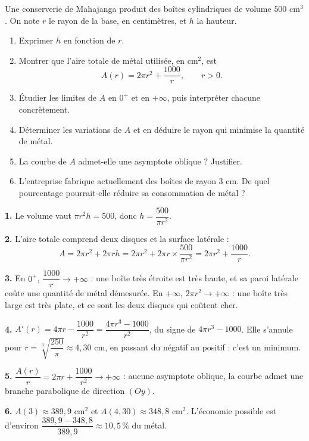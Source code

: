 \begin{jecherche}
Une conserverie de Mahajanga produit des boîtes cylindriques de volume
$500$ cm$^{3}$. On note $r$ le rayon de la base, en centimètres, et $h$ la
hauteur.

\begin{enumerate}[label=\textbf{\arabic*.}, leftmargin=*, itemsep=0.3em]
  \item Exprimer $h$ en fonction de $r$.
  \item Montrer que l'aire totale de métal utilisée, en cm$^{2}$, est
        \[
          A(r) = 2\pi r^{2} + \frac{1000}{r}, \qquad r > 0 .
        \]
  \item Étudier les limites de $A$ en $0^{+}$ et en $+\infty$, puis interpréter
        chacune concrètement.
  \item Déterminer les variations de $A$ et en déduire le rayon qui minimise
        la quantité de métal.
  \item La courbe de $A$ admet-elle une asymptote oblique ? Justifier.
  \item L'entreprise fabrique actuellement des boîtes de rayon $3$ cm. De
        quel pourcentage pourrait-elle réduire sa consommation de métal ?
\end{enumerate}
\end{jecherche}

\begin{corrige}
\textbf{1.} Le volume vaut $\pi r^{2}h = 500$, donc
$h = \dfrac{500}{\pi r^{2}}$.

\textbf{2.} L'aire totale comprend deux disques et la surface latérale :
\[
  A = 2\pi r^{2} + 2\pi r h = 2\pi r^{2} + 2\pi r \times \frac{500}{\pi r^{2}}
    = 2\pi r^{2} + \frac{1000}{r}.
\]

\textbf{3.} En $0^{+}$, $\dfrac{1000}{r} \to +\infty$ : une boîte très étroite
est très haute, et sa paroi latérale coûte une quantité de métal démesurée. En
$+\infty$, $2\pi r^{2} \to +\infty$ : une boîte très large est très plate, et
ce sont les deux disques qui coûtent cher.

\textbf{4.} $A'(r) = 4\pi r - \dfrac{1000}{r^{2}} = \dfrac{4\pi r^{3}-1000}{r^{2}}$,
du signe de $4\pi r^{3}-1000$. Elle s'annule pour
$r = \sqrt[3]{\dfrac{250}{\pi}} \approx 4{,}30$ cm, en passant du négatif au
positif : c'est un minimum.

\textbf{5.} $\dfrac{A(r)}{r} = 2\pi r + \dfrac{1000}{r^{2}} \to +\infty$ :
aucune asymptote oblique, la courbe admet une branche parabolique de direction
$(Oy)$.

\textbf{6.} $A(3) \approx 389{,}9$ cm$^{2}$ et $A(4{,}30) \approx 348{,}8$
cm$^{2}$. L'économie possible est d'environ
$\dfrac{389{,}9-348{,}8}{389{,}9} \approx 10{,}5\,\%$ du métal.
\end{corrige}



